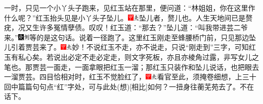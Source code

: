 一时，只见一个小丫头子跑来，见红玉站在那里，便问道：“林姐姐，你在这里作什么呢？”红玉抬头见是小丫头子坠儿。{\includegraphics[width=3mm]{../Images/00002}\includegraphics[width=3mm]{../Images/00012}\footnotesize \kaishu 坠儿者，赘儿也。人生天地间已是赘疣，况又生许多冤情孽债。叹叹！}红玉道：“那去？”坠儿道：“叫我带进芸二爷来。”{\includegraphics[width=3mm]{../Images/00004}\includegraphics[width=3mm]{../Images/00011}\footnotesize \kaishu 等的是这句话。}说着一径跑了。这里红玉刚走至蜂腰桥门前，只见那边坠儿引着贾芸来了。{\includegraphics[width=3mm]{../Images/00002}\includegraphics[width=3mm]{../Images/00012}\footnotesize \kaishu 妙！不说红玉不走，亦不说走，只说“刚走到”三字，可知红玉有私心矣。若说出必定不走必定走，则文字死板，亦且亦棱角过露，非写女儿之笔也。}那贾芸一面走，一面拿眼把红玉一溜；那红玉只装作和坠儿说话，也把眼去一溜贾芸。四目恰相对时，红玉不觉脸红了，{{\includegraphics[width=3mm]{../Images/00002}\includegraphics[width=3mm]{../Images/00012}\footnotesize \kaishu 看官至此，须掩卷细想，上三十回中篇篇句句点“红”字处，可与此处{(想)}{[}相比{]}如何？}}一扭身往蘅芜苑去了。不在话下。


